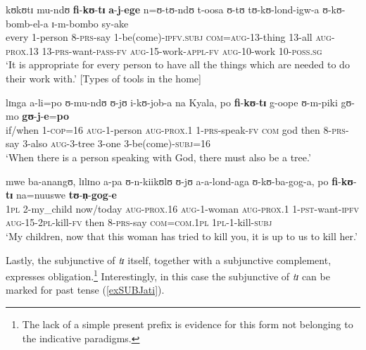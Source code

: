 \begin{exe}
\ex \label{exFikutiTools} \gll kʊkʊtɪ mu-ndʊ \textbf{fi}-\textbf{kʊ}-\textbf{tɪ} \textbf{a}-\textbf{j}-\textbf{ege} n=ʊ-tʊ-ndʊ t-oosa ʊ-tʊ tʊ-kʊ-lond-igw-a ʊ-kʊ-bomb-el-a ɪ-m-bombo sy-ake\\
every 1-person 8-\textsc{prs}-say 1-be(come)-\textsc{ipfv.subj} \textsc{com}=\textsc{aug}-13-thing 13-all \textsc{aug}-\textsc{prox.13} 13-\textsc{prs}-want-\textsc{pass}-\textsc{fv} \textsc{aug}-15-work-\textsc{appl}-\textsc{fv} \textsc{aug}-10-work 10-\textsc{poss.sg}\\
\glt \lq ‎It is appropriate for every person to have all the things which are needed to do their work with.' [Types of tools in the home] %

\ex \label{exFikutiAlt1} \gll lɪnga a-li=po ʊ-mu-ndʊ ʊ-jʊ i-kʊ-job-a na Kyala, po \textbf{fi}-\textbf{kʊ}-\textbf{tɪ} g-oope ʊ-m-piki gʊ-mo \textbf{gʊ}-\textbf{j}-\textbf{e}=\textbf{po}\\
if/when 1-\textsc{cop}=16 \textsc{aug}-1-person \textsc{aug}-\textsc{prox.1} 1-\textsc{prs}-speak-\textsc{fv} \textsc{com} god then 8-\textsc{prs}-say 3-also \textsc{aug}-3-tree 3-one 3-be(come)-\textsc{subj}=16\\
\glt \lq When there is a person speaking with God, there must also be a tree.'\\\citep[210]{BusseJ1949} %

\ex\label{exFikutiAlt3}
\gll mwe ba-anangʊ, lɪlɪno a-pa ʊ-n-kiikʊlʊ ʊ-jʊ a-a-lond-aga ʊ-kʊ-ba-gog-a, po \textbf{fi}-\textbf{kʊ}-\textbf{tɪ} na=nuuswe \textbf{tʊ}-\textbf{n̩}-\textbf{gog}-\textbf{e}\\
\textsc{1pl} 2-my\_child now/today \textsc{aug}-\textsc{prox.16} \textsc{aug}-1-woman \textsc{aug}-\textsc{prox.1} 1-\textsc{pst}-want-\textsc{ipfv} \textsc{aug}-15-\textsc{2pl}-kill-\textsc{fv} then 8-\textsc{prs}-say \textsc{com}=\textsc{com.1pl} \textsc{1pl}-1-kill-\textsc{subj}\\
\glt `My children, now that this woman has tried to kill you, it is up to us to kill her.' \citep[143]{BergerP1933} 
\end{exe}

Lastly, the subjunctive of \textit{tɪ} itself, together with a subjunctive complement, expresses obligation.\footnote{The lack of a simple present prefix is evidence for this form not belonging to the indicative paradigms.} Interestingly, in this case the subjunctive of \textit{tɪ} can be marked for past tense (\ref{exSUBJati}).

